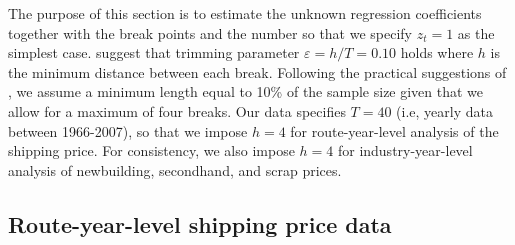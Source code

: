 \documentclass[11pt]{article}
\begin{document}
The purpose of this section is to estimate the unknown regression coefficients together with the break points and the number so that we specify $z_{t}=1$ as the simplest case. \cite{bai2003computation} suggest that trimming parameter $\varepsilon=h/T=0.10$ holds where $h$ is the minimum distance between each break. Following the practical suggestions of \cite{bai2003computation}, we assume a minimum length equal to 10\% of the sample size given that we allow for a maximum of four breaks. Our data specifies $T=40$ (i.e, yearly data between 1966-2007), so that we impose $h=4$ for route-year-level analysis of the shipping price. For consistency, we also impose $h=4$ for industry-year-level analysis of newbuilding, secondhand, and scrap prices.

\subsection{Route-year-level shipping price data}
\end{document}
